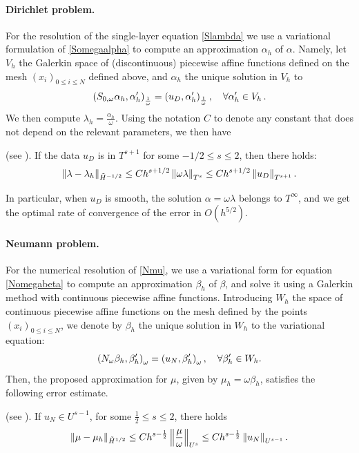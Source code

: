\documentclass[a4paper]{article}
\begin{document}
\paragraph{Dirichlet problem.} For the resolution of the single-layer equation \eqref{Slambda} we use a variational formulation of \eqref{Somegaalpha} 
to compute an approximation $\alpha_h$ of $\alpha$. Namely, let $V_h$ the Galerkin space of (discontinuous) piecewise affine functions 
defined on the mesh $(x_i)_{0\leq i \leq N}$ defined above, and $\alpha_h$ the unique solution in $V_h$ to
\[ \left( S_{0,\omega} \alpha_h,\alpha_h'\right)_\frac{1}{\omega} = \left( u_D,\alpha_h'\right)_\frac{1}{\omega}, \quad \forall \alpha_h' \in V_h\,.\]
We then compute $\lambda_h = \frac{\alpha_h}{\omega}$. Using the notation $C$ to denote any constant that does not depend on the relevant parameters, we then have
\begin{theorem}(see \cite{averseng}).
	If the data $u_D$ is in $T^{s+1}$ for some $-1/2 \leq s \leq 2$, then there holds:
	\[ \left\|\lambda - \lambda_h\right\|_{\tilde{H}^{-1/2}} \leq C h^{s+1/2} \left\|\omega \lambda\right\|_{T^{s}}\leq C h^{s+1/2} \left\|u_D\right\|_{T^{s+1}}.\]
	\label{theOrdreCVDirichlet}
\end{theorem}
In particular, when $u_D$ is smooth, the solution $\alpha = \omega \lambda$ belongs to $T^{\infty}$, and we get the optimal rate of convergence of the error in  
$O(h^{5/2})$.

\paragraph{Neumann problem.} For the numerical resolution of \eqref{Nmu}, we use a variational form for equation \eqref{Nomegabeta} to compute an approximation $\beta_h$ of $\beta$, and solve 
it using a Galerkin method with continuous piecewise affine functions. Introducing $W_h$ the space of continuous piecewise affine functions on the mesh
defined by the points $(x_i)_{0\leq i\leq N}$, we denote by $\beta_h$ the unique solution in $W_h$ to the variational equation:
\begin{equation}
\left( N_\omega \beta_h,\beta_h'\right)_{\omega} = \left( u_N,\beta_h'\right)_{\omega}, \quad \forall \beta_h' \in W_h.
\label{NomegaBetaGalerk}
\end{equation}
Then, the proposed approximation for $\mu$, given by $\mu_h = \omega \beta_h$, satisfies the following error estimate. 
\begin{theorem}(see \cite{averseng}).
	If $u_N \in U^{s-1}$, for some $\frac{1}{2} \leq s \leq 2$, there holds 
	\[\left\|\mu - \mu_h\right\|_{\tilde{H}^{1/2}} \leq C h^{s - \frac{1}{2}}\left\|\frac{\mu}{\omega}\right\|_{U^{s}}\leq C h^{s - \frac{1}{2}}\left\|u_N\right\|_{U^{s-1}}.\]
	\label{theOrdreCVNeumann}
\end{theorem}
\end{document}
